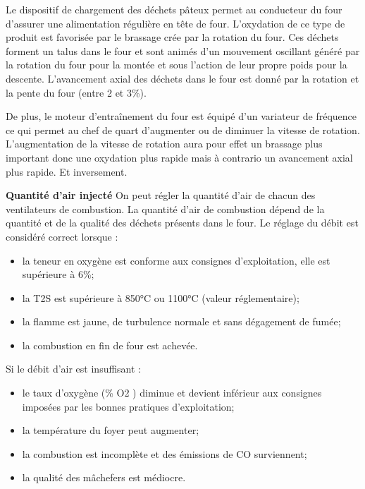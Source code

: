 \vspace{0.3cm}

Le dispositif de chargement des déchets pâteux permet au conducteur du four d’assurer une alimentation régulière en tête de four. L’oxydation de ce type de produit est favorisée par le brassage crée par la rotation du four. Ces déchets forment un talus dans le four et sont animés d’un mouvement oscillant généré par la rotation du four pour la montée et sous l’action de leur propre poids pour la descente. L’avancement axial des déchets dans le four est donné par la rotation et la pente du four (entre 2 et 3\%).
\vspace{0.3cm}

De plus, le moteur d’entraînement du four est équipé d’un variateur de fréquence ce qui permet au chef de quart d’augmenter ou de diminuer la vitesse de rotation. L’augmentation de la vitesse de rotation aura pour effet un brassage plus important donc une oxydation plus rapide mais à contrario un avancement axial plus rapide. Et inversement.


\vspace{0.3cm}

\textbf{Quantité d'air injecté}
On peut régler la quantité d’air de chacun des ventilateurs de combustion.
La quantité d’air de combustion dépend de la quantité et de la qualité des déchets présents dans le four. Le réglage du débit est considéré correct lorsque :

\begin{itemize}
\item  la teneur en oxygène est conforme aux consignes d’exploitation, elle est supérieure à 6\%;
\item  la T2S est supérieure à 850°C ou 1100°C (valeur réglementaire);
\item  la flamme est jaune, de turbulence normale et sans dégagement de fumée;
\item  la combustion en fin de four est achevée.

\end{itemize}

Si le débit d'air est insuffisant :
\begin{itemize}
\item  le taux d’oxygène (\% O2 ) diminue et devient inférieur aux consignes imposées par les bonnes pratiques d’exploitation;
\item  la température du foyer peut augmenter;
\item  la combustion est incomplète et des émissions de CO surviennent;
\item  la qualité des mâchefers est médiocre.

\end{itemize}


